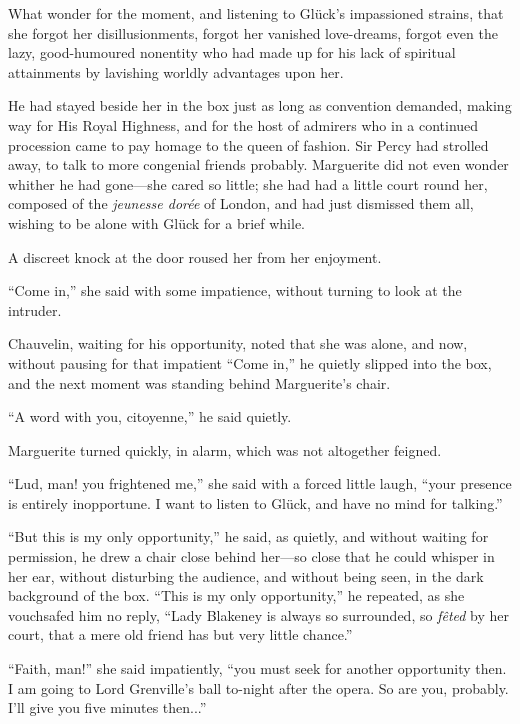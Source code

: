 What wonder for the moment, and listening to Glück's impassioned strains, that she forgot her disillusionments, forgot her vanished love-dreams, forgot even the lazy, good-humoured nonentity who had made up for his lack of spiritual attainments by lavishing worldly advantages upon her.

He had stayed beside her in the box just as long as convention demanded, making way for His Royal Highness, and for the host of admirers who in a continued procession came to pay homage to the queen of fashion. Sir Percy had strolled away, to talk to more congenial friends probably. Marguerite did not even wonder whither he had gone---she cared so little; she had had a little court round her, composed of the \textit{jeunesse dorée} of London, and had just dismissed them all, wishing to be alone with Glück for a brief while.

A discreet knock at the door roused her from her enjoyment.

\enquote{Come in,} she said with some impatience, without turning to look at the intruder.

Chauvelin, waiting for his opportunity, noted that she was alone, and now, without pausing for that impatient \enquote{Come in,} he quietly slipped into the box, and the next moment was standing behind Marguerite's chair.

\enquote{A word with you, citoyenne,} he said quietly.

Marguerite turned quickly, in alarm, which was not altogether feigned.

\enquote{Lud, man! you frightened me,} she said with a forced little laugh, \enquote{your presence is entirely inopportune. I want to listen to Glück, and have no mind for talking.}

\enquote{But this is my only opportunity,} he said, as quietly, and without waiting for permission, he drew a chair close behind her---so close that he could whisper in her ear, without disturbing the audience, and without being seen, in the dark background of the box. \enquote{This is my only opportunity,} he repeated, as she vouchsafed him no reply, \enquote{Lady Blakeney is always so surrounded, so \textit{fêted} by her court, that a mere old friend has but very little chance.}

\enquote{Faith, man!} she said impatiently, \enquote{you must seek for another opportunity then. I am going to Lord Grenville's ball to-night after the opera. So are you, probably. I'll give you five minutes then...}


